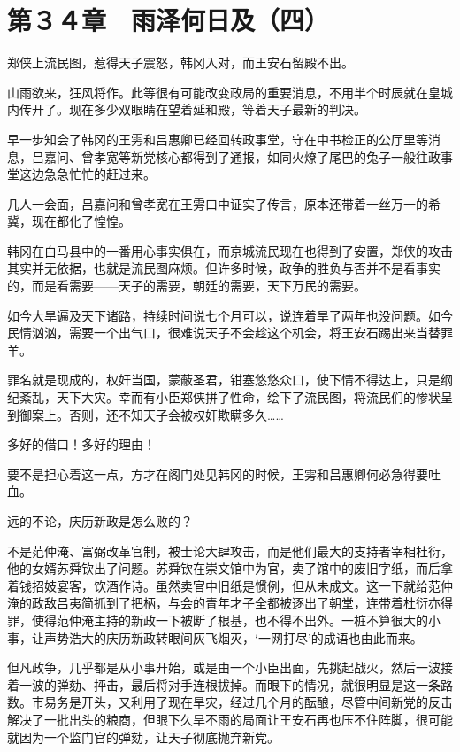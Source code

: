 \section{第３４章　雨泽何日及（四）}

郑侠上流民图，惹得天子震怒，韩冈入对，而王安石留殿不出。

山雨欲来，狂风将作。此等很有可能改变政局的重要消息，不用半个时辰就在皇城内传开了。现在多少双眼睛在望着延和殿，等着天子最新的判决。

早一步知会了韩冈的王雱和吕惠卿已经回转政事堂，守在中书检正的公厅里等消息，吕嘉问、曾孝宽等新党核心都得到了通报，如同火燎了尾巴的兔子一般往政事堂这边急急忙忙的赶过来。

几人一会面，吕嘉问和曾孝宽在王雱口中证实了传言，原本还带着一丝万一的希冀，现在都化了惶惶。

韩冈在白马县中的一番用心事实俱在，而京城流民现在也得到了安置，郑侠的攻击其实并无依据，也就是流民图麻烦。但许多时候，政争的胜负与否并不是看事实的，而是看需要——天子的需要，朝廷的需要，天下万民的需要。

如今大旱遍及天下诸路，持续时间说七个月可以，说连着旱了两年也没问题。如今民情汹汹，需要一个出气口，很难说天子不会趁这个机会，将王安石踢出来当替罪羊。

罪名就是现成的，权奸当国，蒙蔽圣君，钳塞悠悠众口，使下情不得达上，只是纲纪紊乱，天下大灾。幸而有小臣郑侠拼了性命，绘下了流民图，将流民们的惨状呈到御案上。否则，还不知天子会被权奸欺瞒多久……

多好的借口！多好的理由！

要不是担心着这一点，方才在阁门处见韩冈的时候，王雱和吕惠卿何必急得要吐血。

远的不论，庆历新政是怎么败的？

不是范仲淹、富弼改革官制，被士论大肆攻击，而是他们最大的支持者宰相杜衍，他的女婿苏舜钦出了问题。苏舜钦在崇文馆中为官，卖了馆中的废旧字纸，而后拿着钱招妓宴客，饮酒作诗。虽然卖官中旧纸是惯例，但从未成文。这一下就给范仲淹的政敌吕夷简抓到了把柄，与会的青年才子全都被逐出了朝堂，连带着杜衍亦得罪，使得范仲淹主持的新政一下被断了根基，也不得不出外。一桩不算很大的小事，让声势浩大的庆历新政转眼间灰飞烟灭，‘一网打尽’的成语也由此而来。

但凡政争，几乎都是从小事开始，或是由一个小臣出面，先挑起战火，然后一波接着一波的弹劾、抨击，最后将对手连根拔掉。而眼下的情况，就很明显是这一条路数。市易务是开头，又利用了现在旱灾，经过几个月的酝酿，尽管中间新党的反击解决了一批出头的粮商，但眼下久旱不雨的局面让王安石再也压不住阵脚，很可能就因为一个监门官的弹劾，让天子彻底抛弃新党。

